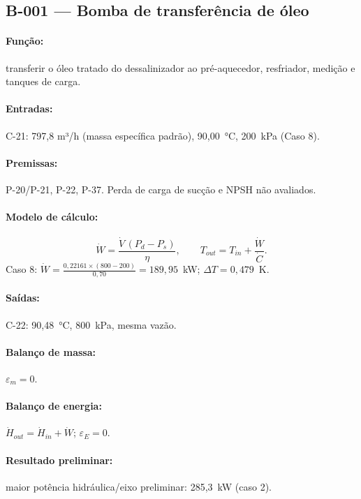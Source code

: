 \documentclass[11pt,a4paper]{article}
\numberwithin{equation}{section}
\numberwithin{table}{section}
\numberwithin{figure}{section}
\begin{document}
\subsection{B-001 --- Bomba de transferência de óleo}
\paragraph{Função:} transferir o óleo tratado do dessalinizador ao pré-aquecedor, resfriador, medição e tanques de carga.
\paragraph{Entradas:} C-21: 797,8 m³/h (massa específica padrão), 90,00~\si{\celsius}, 200~\si{\kilo\pascal} (Caso 8).
\paragraph{Premissas:} P-20/P-21, P-22, P-37. Perda de carga de sucção e NPSH não avaliados.
\paragraph{Modelo de cálculo:}
\begin{equation}
\dot W=\frac{\dot V\,(P_{d}-P_{s})}{\eta},\qquad T_{out}=T_{in}+\frac{\dot W}{\dot C}.
\end{equation}
Caso 8: $\dot W=\frac{0{,}22161\times(800-200)}{0{,}70}=189{,}95$~\si{\kilo\watt}; $\Delta T=0{,}479$~\si{\kelvin}.

\paragraph{Saídas:} C-22: 90,48~\si{\celsius}, 800~\si{\kilo\pascal}, mesma vazão.
\paragraph{Balanço de massa:} $\varepsilon_m=$$0$.
\paragraph{Balanço de energia:} $\dot H_{out}=\dot H_{in}+\dot W$; $\varepsilon_E=$$0$.
\paragraph{Resultado preliminar:} maior potência hidráulica/eixo preliminar: 285,3~\si{\kilo\watt} (caso 2).
\end{document}
